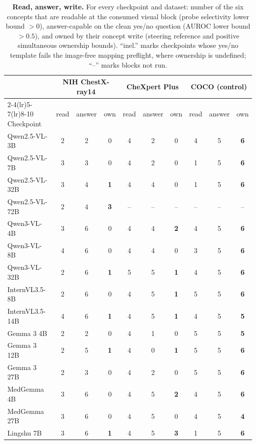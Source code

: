 \begin{table}[t]
\centering
\scriptsize
\setlength{\tabcolsep}{3.2pt}
\caption{\textbf{Read, answer, write.} For every checkpoint and dataset: number of the six concepts that are readable at the consumed visual block (probe selectivity lower bound $>0$), answer-capable on the clean yes/no question (AUROC lower bound $>0.5$), and owned by their concept write (steering reference and positive simultaneous ownership bounds). ``inel.'' marks checkpoints whose yes/no template fails the image-free mapping preflight, where ownership is undefined; ``--'' marks blocks not run.}
\label{tab:cf-leaderboard}
\begin{tabular}{lccccccccc}
\toprule
& \multicolumn{3}{c}{NIH ChestX-ray14} & \multicolumn{3}{c}{CheXpert Plus} & \multicolumn{3}{c}{COCO (control)} \\
\cmidrule(lr){2-4}\cmidrule(lr){5-7}\cmidrule(lr){8-10}
Checkpoint & read & answer & own & read & answer & own & read & answer & own \\
\midrule
Qwen2.5-VL-3B & 2 & 2 & 0 & 4 & 2 & 0 & 4 & 5 & \textbf{6} \\
Qwen2.5-VL-7B & 3 & 3 & 0 & 4 & 2 & 0 & 1 & 5 & \textbf{6} \\
Qwen2.5-VL-32B & 3 & 4 & \textbf{1} & 4 & 4 & 0 & 1 & 5 & \textbf{6} \\
Qwen2.5-VL-72B & 2 & 4 & \textbf{3} & -- & -- & -- & -- & -- & -- \\
Qwen3-VL-4B & 3 & 6 & 0 & 4 & 4 & \textbf{2} & 4 & 5 & \textbf{6} \\
Qwen3-VL-8B & 4 & 6 & 0 & 4 & 4 & 0 & 3 & 5 & \textbf{6} \\
Qwen3-VL-32B & 2 & 6 & \textbf{1} & 5 & 5 & \textbf{1} & 4 & 5 & \textbf{6} \\
InternVL3.5-8B & 2 & 6 & 0 & 4 & 5 & \textbf{1} & 5 & 5 & \textbf{6} \\
InternVL3.5-14B & 4 & 6 & \textbf{1} & 4 & 5 & \textbf{1} & 4 & 5 & \textbf{5} \\
Gemma 3 4B & 2 & 2 & 0 & 4 & 1 & 0 & 5 & 5 & \textbf{5} \\
Gemma 3 12B & 2 & 5 & \textbf{1} & 4 & 0 & \textbf{1} & 5 & 5 & \textbf{6} \\
Gemma 3 27B & 2 & 3 & 0 & 4 & 2 & 0 & 5 & 5 & \textbf{6} \\
MedGemma 4B & 3 & 6 & 0 & 4 & 5 & \textbf{2} & 4 & 5 & \textbf{6} \\
MedGemma 27B & 3 & 6 & 0 & 4 & 5 & 0 & 4 & 5 & \textbf{4} \\
Lingshu 7B & 3 & 6 & \textbf{1} & 4 & 5 & \textbf{3} & 1 & 5 & \textbf{6} \\

\end{tabular}
\end{table}
